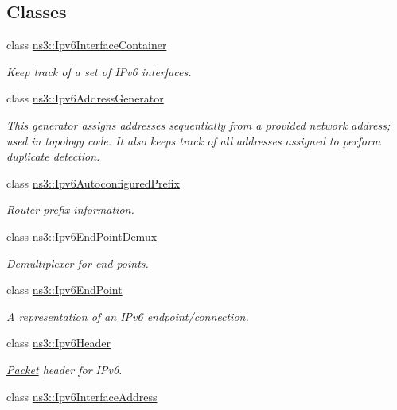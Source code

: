 \subsection*{Classes}
\begin{DoxyCompactItemize}
\item 
class \hyperlink{classns3_1_1Ipv6InterfaceContainer}{ns3\+::\+Ipv6\+Interface\+Container}
\begin{DoxyCompactList}\small\item\em Keep track of a set of I\+Pv6 interfaces. \end{DoxyCompactList}\item 
class \hyperlink{classns3_1_1Ipv6AddressGenerator}{ns3\+::\+Ipv6\+Address\+Generator}
\begin{DoxyCompactList}\small\item\em This generator assigns addresses sequentially from a provided network address; used in topology code. It also keeps track of all addresses assigned to perform duplicate detection. \end{DoxyCompactList}\item 
class \hyperlink{classns3_1_1Ipv6AutoconfiguredPrefix}{ns3\+::\+Ipv6\+Autoconfigured\+Prefix}
\begin{DoxyCompactList}\small\item\em Router prefix information. \end{DoxyCompactList}\item 
class \hyperlink{classns3_1_1Ipv6EndPointDemux}{ns3\+::\+Ipv6\+End\+Point\+Demux}
\begin{DoxyCompactList}\small\item\em Demultiplexer for end points. \end{DoxyCompactList}\item 
class \hyperlink{classns3_1_1Ipv6EndPoint}{ns3\+::\+Ipv6\+End\+Point}
\begin{DoxyCompactList}\small\item\em A representation of an I\+Pv6 endpoint/connection. \end{DoxyCompactList}\item 
class \hyperlink{classns3_1_1Ipv6Header}{ns3\+::\+Ipv6\+Header}
\begin{DoxyCompactList}\small\item\em \hyperlink{classns3_1_1Packet}{Packet} header for I\+Pv6. \end{DoxyCompactList}\item 
class \hyperlink{classns3_1_1Ipv6InterfaceAddress}{ns3\+::\+Ipv6\+Interface\+Address}

\end{DoxyCompactItemize}
